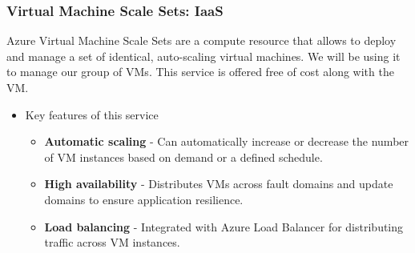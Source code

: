 \documentclass{llncs}
\begin{document}
\subsubsection{Virtual Machine Scale Sets: IaaS} \leavevmode\newline
Azure Virtual Machine Scale Sets are a compute resource that allows to deploy and manage a set of identical, auto-scaling virtual machines.
We will be using it to manage our group of VMs. This service is offered free of cost along with the VM.
\begin{itemize}
\item Key features of this service
    \begin{itemize}
        \item \textbf{Automatic scaling} -  Can automatically increase or decrease the number of VM instances based on demand or a defined schedule.
        \item \textbf{High availability} - Distributes VMs across fault domains and update domains to ensure application resilience.
        \item \textbf{Load balancing} - Integrated with Azure Load Balancer for distributing traffic across VM instances.
    \end{itemize}
\end{itemize}
\end{document}
